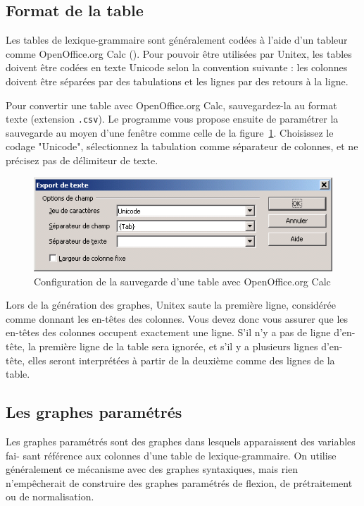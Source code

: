 \subsection{Format de la table}
Les tables de lexique-grammaire sont généralement codées à l’aide d’un tableur comme
OpenOffice.org Calc (\cite{OpenOffice}). Pour pouvoir être utilisées par Unitex, les tables doivent
être codées en texte Unicode selon la convention suivante : les colonnes doivent être séparées
par des tabulations et les lignes par des retours à la ligne.


\bigskip
\noindent Pour convertir une table avec OpenOffice.org Calc, sauvegardez-la au format texte
(extension \verb$.csv$). Le programme vous propose ensuite de paramétrer la sauvegarde au moyen
d’une fenêtre comme celle de la figure~\ref{fig-csv-export}. Choisissez le codage "Unicode",
sélectionnez la tabulation comme séparateur de colonnes, et ne précisez pas de délimiteur de texte.

\begin{figure}[!ht]
\begin{center}
\includegraphics[width=12cm]{resources/img/fig8-2.png}
\caption{Configuration de la sauvegarde d’une table avec OpenOffice.org Calc\label{fig-csv-export}}
\end{center}
\end{figure}

\bigskip
\noindent Lors de la génération des graphes, Unitex saute la première ligne, considérée comme
donnant les en-têtes des colonnes. Vous devez donc vous assurer que les en-têtes des colonnes
occupent exactement une ligne. S’il n’y a pas de ligne d’en-tête, la première ligne de
la table sera ignorée, et s’il y a plusieurs lignes d’en-tête, elles seront interprétées à partir de
la deuxième comme des lignes de la table.



\subsection{Les graphes paramétrés}
Les graphes paramétrés sont des graphes dans lesquels apparaissent des variables fai-
sant référence aux colonnes d’une table de lexique-grammaire. On utilise généralement
ce mécanisme avec des graphes syntaxiques, mais rien n’empêcherait de construire des
graphes paramétrés de flexion, de prétraitement ou de normalisation.


